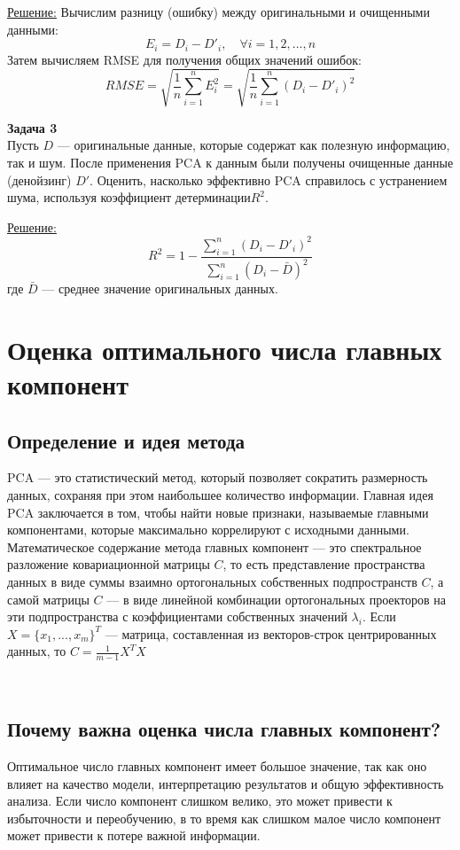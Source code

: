 \underline{Решение:}
Вычислим разницу (ошибку) между оригинальными и очищенными данными:
   \[
   E_{i} = D_{i} - D'_{i}, \quad \forall i = 1, 2, \ldots, n
   \]
Затем вычисляем RMSE для получения общих значений ошибок:
   \[
   RMSE = \sqrt{\frac{1}{n} \sum_{i=1}^{n} E_{i}^2} = \sqrt{\frac{1}{n} \sum_{i=1}^{n} (D_{i} - D'_{i})^2}
   \]

\textbf{Задача 3}\\
Пусть \( D \) --- оригинальные данные, которые содержат как полезную информацию, так и шум. После применения PCA к данным были получены очищенные данные (денойзинг) \( D' \). Оценить, насколько эффективно PCA справилось с устранением шума, используя коэффициент детерминации\( R^2 \).

\underline{Решение:}
   \[
   R^2 = 1 - \frac{\sum_{i=1}^{n} (D_{i} - D'_{i})^2}{\sum_{i=1}^{n} (D_{i} - \bar{D})^2}
   \]
   где \( \bar{D} \) — среднее значение оригинальных данных.



\section{Оценка оптимального числа главных компонент}
\subsection{Определение и идея метода}
PCA — это статистический метод, который позволяет сократить размерность данных, сохраняя при этом наибольшее количество информации. Главная идея PCA заключается в том, чтобы найти новые признаки, называемые главными компонентами, которые максимально коррелируют с исходными данными.\\

Математическое содержание метода главных компонент — это спектральное разложение ковариационной матрицы $\displaystyle C$, то есть представление пространства данных в виде суммы взаимно ортогональных собственных подпространств
$\displaystyle C$, а самой матрицы $\displaystyle C$ — в виде линейной комбинации ортогональных проекторов на эти подпространства с коэффициентами собственных значений $\displaystyle \lambda _{i}$. Если $X = \{x_{1}, ... ,x_{m}\}^{T}$  — матрица, составленная из векторов-строк центрированных данных, то $\displaystyle C =\frac {1}{m-1} X ^{T} X$

\\

\subsection{Почему важна оценка числа главных компонент?}
Оптимальное число главных компонент имеет большое значение, так как оно влияет на качество модели, интерпретацию результатов и общую эффективность анализа. Если число компонент слишком велико, это может привести к избыточности и переобучению, в то время как слишком малое число компонент может привести к потере важной информации.


